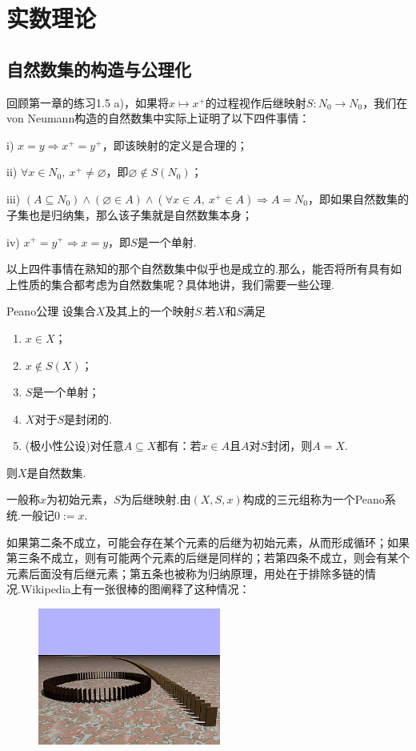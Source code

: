 \chapter{实数理论}

\section{自然数集的构造与公理化}

回顾第一章的练习1.5 a)，如果将$x \mapsto x^+$的过程视作后继映射$S:N_0 \to N_0$，我们在von Neumann构造的自然数集中实际上证明了以下四件事情：

i) $x=y \Rightarrow x^+ = y^+$，即该映射的定义是合理的；

ii) $\forall x \in N_0,~x^+ \neq \varnothing$，即$\varnothing \notin S(N_0)$；

iii) $(A \subseteq N_0) \wedge (\varnothing \in A) \wedge (\forall x \in A,~x^+ \in A) \Rightarrow A=N_0$，即如果自然数集的子集也是归纳集，那么该子集就是自然数集本身；

iv) $x^+=y^+ \Rightarrow x=y$，即$S$是一个单射.

以上四件事情在熟知的那个自然数集中似乎也是成立的.那么，能否将所有具有如上性质的集合都考虑为自然数集呢？具体地讲，我们需要一些公理.

\begin{axiom}{Peano公理}
	设集合$X$及其上的一个映射$S$.若$X$和$S$满足
	\begin{enumerate}
		\item $x \in X$；
		\item $x \notin S(X)$；
		\item $S$是一个单射；
		\item $X$对于$S$是封闭的.
		\item (极小性公设)对任意$A \subseteq X$都有：若$x \in A$且$A$对$S$封闭，则$A=X$.
	\end{enumerate}
	则$X$是自然数集.
\end{axiom}
\begin{remark}
	一般称$x$为初始元素，$S$为后继映射.由$(X,S,x)$构成的三元组称为一个Peano系统.一般记$0:=x$.
\end{remark}

如果第二条不成立，可能会存在某个元素的后继为初始元素，从而形成循环；如果第三条不成立，则有可能两个元素的后继是同样的；若第四条不成立，则会有某个元素后面没有后继元素；第五条也被称为归纳原理，用处在于排除多链的情况.Wikipedia上有一张很棒的图阐释了这种情况：

\begin{figure}[h!]
	\centering
	\includegraphics[width=6cm]{attachment/440px-Domino_effect_visualizing_exclusion_of_junk_term_by_induction_axiom.jpg}
\end{figure}

